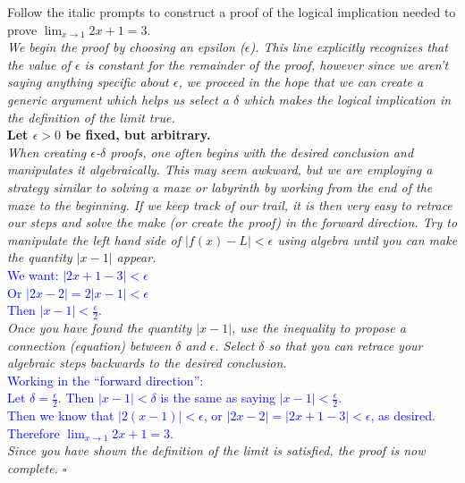 \documentclass{ximera}
\begin{document}
\begin{exercise}
    Follow the italic prompts to construct a proof of the logical implication needed to prove $\lim_{x\rightarrow 1}2x+1=3$.\\

    \textit{We begin the proof by choosing an epsilon ($\epsilon$).  This line explicitly recognizes that the value of $\epsilon$ is constant for the remainder of the proof, however since we aren't saying anything specific about $\epsilon$, we proceed in the hope that we can create a generic argument which helps us select a $\delta$ which makes the logical implication in the definition of the limit true.}\\
    \textbf{Let $\epsilon>0$ be fixed, but arbitrary.}\\
    \textit{When creating $\epsilon$-$\delta$ proofs, one often begins with the desired conclusion and manipulates it algebraically.  This may seem awkward, but we are employing a strategy similar to solving a maze or labyrinth by working from the end of the maze to the beginning.  If we keep track of our trail, it is then very easy to retrace our steps and solve the make (or create the proof) in the forward direction.  Try to manipulate the left hand side of $|f(x)-L|<\epsilon$ using algebra until you can make the quantity $|x-1|$ appear.}\\
    \textcolor{blue}{We want: $|2x+1-3|<\epsilon$\\
    Or $|2x-2|=2|x-1|<\epsilon$\\
    Then $|x-1|<\frac{\epsilon}{2}$.}\\
    \textit{Once you have found the quantity $|x-1|$, use the inequality to propose a connection (equation) between $\delta$ and $\epsilon$.  Select $\delta$ so that you can retrace your algebraic steps backwards to the desired conclusion.}\\
    \textcolor{blue}{Working in the ``forward direction'':\\
    Let $\delta=\frac{\epsilon}{2}$.  Then $|x-1|<\delta$ is the same as saying $|x-1|<\frac{\epsilon}{2}$.\\
    Then we know that $|2(x-1)|<\epsilon$, or $|2x-2|=|2x+1-3|<\epsilon$, as desired.\\
    Therefore $\lim_{x\rightarrow 1}2x+1=3$.}
    \\
    \textit{Since you have shown the definition of the limit is satisfied, the proof is now complete. $\square$}
\end{exercise}
\end{document}
